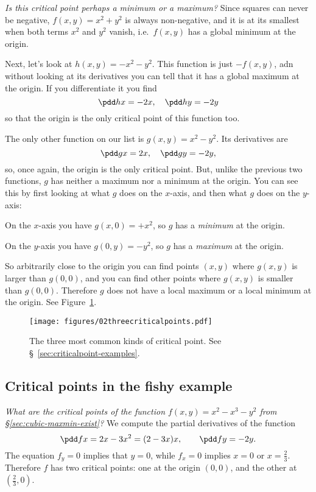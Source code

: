 \textit{Is this critical point perhaps a minimum or a maximum?}  Since
squares can never be negative, $f(x,y) = x^2+y^2$ is always non-negative,
and it is at its smallest when both terms $x^2$ and $y^2$ vanish, i.e.\
$f(x, y)$ has a global minimum at the origin.

Next, let's look at $h(x,y) = -x^2-y^2$.  This function is just $-f(x,y)$,
adn without looking at its derivatives you can tell that it has a global
maximum at the origin.  If you differentiate it you find
\[
\pdd hx = -2x, \quad \pdd hy = -2y
\]
so that the origin is the only critical point of this function too.

The only other function on our list is $g(x, y) = x^2-y^2$.  Its
derivatives are
\[
\pdd gx = 2x, \quad \pdd gy = -2y,
\]
so, once again, the origin is the only critical point.  But, unlike the
previous two functions, $g$ has neither a maximum nor a minimum at the
origin.  You can see this by first looking at what $g$ does on the
$x$-axis, and then what $g$ does on the $y$-axis:

On the $x$-axis you have $g(x, 0) = +x^2$, so $g$ has a \emph{minimum} at
the origin.

On the $y$-axis you have $g(0,y) = -y^2$, so $g$ has a \emph{maximum} at
the origin.

So arbitrarily close to the origin you can find points $(x,y)$ where
$g(x,y)$ is larger than $g(0,0)$, and you can find other points where
$g(x,y)$ is smaller than $g(0,0)$.  Therefore $g$ does not have a local
maximum or a local minimum at the origin.  See
Figure~\ref{fig:most-common-crpts}.

\begin{figure}[htb]
  \centering
  \texttt{[image: figures/02threecriticalpoints.pdf]}
  \caption{The three most common kinds of critical point.  See
    \S~\ref{sec:criticalpoint-examples}.}
  \label{fig:most-common-crpts} 
\end{figure}

\subsection{Critical points in the fishy example}  %

\label{sec:critical-fish} 
\textit{What are the critical points of the function $f(x, y) =
  x^2-x^3-y^2$ from \S \ref{sec:cubic-maxmin-exist}?}
We compute the partial derivatives of the function
\[
\pdd fx = 2x-3x^2 = (2-3x)x,\qquad
\pdd fy = -2y.
\]
The equation $f_y=0$ implies that $y=0$, while $f_x=0$ implies $x=0$ or
$x=\frac{2} {3}$.  Therefore $f$ has two critical points: one at the origin
$(0,0)$, and the other at $(\frac23,0)$.

